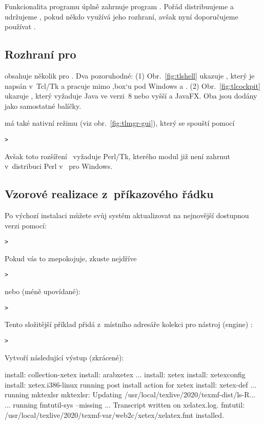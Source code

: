 \documentclass[\classoptions,slovak,english,czech]{\classname}
\newcommand{\singleuv}[1]{,#1`}
\begin{document}
Funkcionalita programu  úplně zahrnuje program .  
Pořád distribuujeme a udržujeme , pokud někdo využívá jeho
rozhraní, avšak nyní doporučujeme používat .

\subsection{Rozhraní \GUI{} pro }

\TL{} obsahuje několik \GUI{} pro . 
Dva pozoruhodné: (1) Obr.~\ref{fig:tlshell} ukazuje ,
který je napsán v~Tcl/Tk a pracuje mimo \singleuv{box}u pod Windows
a \MacOSX. (2) Obr.~\ref{fig:tlcockpit} ukazuje ,
který vyžaduje Java ve verzi~8 nebo vyšší a JavaFX. 
Oba jsou dodány jako samostatné balíčky.

 má také nativní režimu \GUI{} 
(viz obr.~\ref{fig:tlmgr-gui}), který se spouští pomocí
\begin{alltt}
> 
\end{alltt}
Avšak toto rozšíření \GUI\ vyžaduje Perl/Tk, kterého modul již není
zahrnut v~distribuci Perl v~\TL{} pro Windows.



\subsection{Vzorové realizace  z~příkazového řádku}

Po výchozí instalaci můžete svůj systém aktualizovat
na nejnovější dostupnou verzi pomocí:
\begin{alltt}
> 
\end{alltt}
Pokud vás to znepokojuje, zkuste nejdříve
\begin{alltt}
> 
\end{alltt}
nebo (méně upovídané):
\begin{alltt}
> 
\end{alltt}

Tento složitější příklad přidá z~místního adresáře kolekci
pro nástroj (engine) \XeTeX:

\begin{alltt}
> 
\end{alltt}
Vytvoří následující výstup (zkrácené):
\begin{fverbatim}
install: collection-xetex
install: arabxetex
...
install: xetex
install: xetexconfig
install: xetex.i386-linux
running post install action for xetex
install: xetex-def
...
running mktexlsr
mktexlsr: Updating /usr/local/texlive/2020/texmf-dist/ls-R...
...
running fmtutil-sys --missing
...
Transcript written on xelatex.log.
fmtutil: /usr/local/texlive/2020/texmf-var/web2c/xetex/xelatex.fmt installed.
\end{fverbatim}
\end{document}
